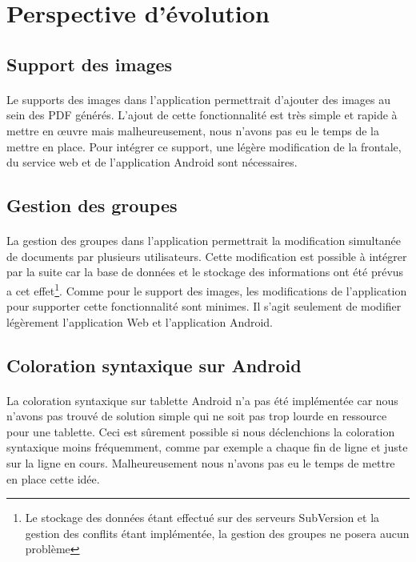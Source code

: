 \documentclass[a4paper,12pt]{article}
\begin{document}
\newpage
\section{Perspective d'évolution}
\subsection{Support des images}
\paragraph*{}
Le supports des images dans l'application permettrait d'ajouter des images au sein des PDF générés. L'ajout de cette fonctionnalité est très simple et rapide à mettre en \oe uvre mais malheureusement, nous n'avons pas eu le temps de la mettre en place. Pour intégrer ce support, une légère modification de la frontale, du service web et de l'application Android sont nécessaires.

\subsection{Gestion des groupes}
\paragraph*{}
La gestion des groupes dans l'application permettrait la modification simultanée de documents par plusieurs utilisateurs. Cette modification est possible à intégrer par la suite car la base de données et le stockage des informations ont été prévus a cet effet\footnote{Le stockage des données étant effectué sur des serveurs SubVersion et la gestion des conflits étant implémentée, la gestion des groupes ne posera aucun problème}. Comme pour le support des images, les modifications de l'application pour supporter cette fonctionnalité sont minimes. Il s'agit seulement de modifier légèrement l'application Web et l'application Android.

\subsection{Coloration syntaxique sur Android}
\paragraph*{}
La coloration syntaxique sur tablette Android n'a pas été implémentée car nous n'avons pas trouvé de solution simple qui ne soit pas trop lourde en ressource pour une tablette. Ceci est sûrement possible si nous déclenchions la coloration syntaxique moins fréquemment, comme par exemple a chaque fin de ligne et juste sur la ligne en cours. Malheureusement nous n'avons pas eu le temps de mettre en place cette idée.
\end{document}
